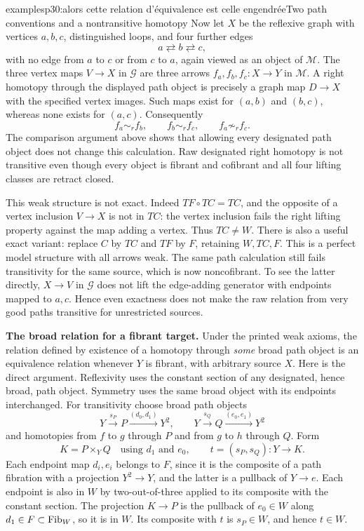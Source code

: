 \begin{dcomment}{examples}{p30:alors cette relation d'équivalence est celle engendrée}{Two path conventions and a nontransitive homotopy}
Now let $X$ be the reflexive graph with vertices $a,b,c$, distinguished loops, and four further edges
\[
 a\rightleftarrows b\rightleftarrows c,
\]
with no edge from $a$ to $c$ or from $c$ to $a$, again viewed as an object of $\mathcal M$. The three vertex maps $V\to X$ in $\mathcal G$ are three arrows $f_a,f_b,f_c:X\to Y$ in $\mathcal M$. A right homotopy through the displayed path object is precisely a graph map $D\to X$ with the specified vertex images. Such maps exist for $(a,b)$ and $(b,c)$, whereas none exists for $(a,c)$. Consequently
\[
 f_a\sim_r f_b,\qquad f_b\sim_r f_c,
 \qquad f_a\not\sim_r f_c.
\]
The comparison argument above shows that allowing every designated path object does not change this calculation. Raw designated right homotopy is not transitive even though every object is fibrant and cofibrant and all four lifting classes are retract closed.

This weak structure is not exact. Indeed $TF\circ TC=TC$, and the opposite of a vertex inclusion $V\to X$ is not in $TC$: the vertex inclusion fails the right lifting property against the map adding a vertex. Thus $TC\ne W$. There is also a useful exact variant: replace $C$ by $TC$ and $TF$ by $F$, retaining $W,TC,F$. This is a perfect model structure with all arrows weak. The same path calculation still fails transitivity for the same source, which is now noncofibrant. To see the latter directly, $X\to V$ in $\mathcal G$ does not lift the edge-adding generator with endpoints mapped to $a,c$. Hence even exactness does not make the raw relation from very good paths transitive for unrestricted sources.

\noindent\textbf{The broad relation for a fibrant target.}
Under the printed weak axioms, the relation defined by existence of a homotopy through \emph{some} broad path object is an equivalence relation whenever $Y$ is fibrant, with arbitrary source $X$. Here is the direct argument. Reflexivity uses the constant section of any designated, hence broad, path object. Symmetry uses the same broad object with its endpoints interchanged. For transitivity choose broad path objects
\[
 Y\xrightarrow{s_P}P\xrightarrow{(d_0,d_1)}Y^2,
 \qquad
 Y\xrightarrow{s_Q}Q\xrightarrow{(e_0,e_1)}Y^2
\]
and homotopies from $f$ to $g$ through $P$ and from $g$ to $h$ through $Q$. Form
\[
 K=P\mathbin{\times_{Y}}Q
 \quad\text{using }d_1\text{ and }e_0,
 \qquad
 t=(s_P,s_Q):Y\longrightarrow K.
\]
Each endpoint map $d_i,e_i$ belongs to $F$, since it is the composite of a path fibration with a projection $Y^2\to Y$, and the latter is a pullback of $Y\to e$. Each endpoint is also in $W$ by two-out-of-three applied to its composite with the constant section. The projection $K\to P$ is the pullback of $e_0\in W$ along $d_1\in F\subset\mathrm{Fib}_W$, so it is in $W$. Its composite with $t$ is $s_P\in W$, and hence $t\in W$.


\end{dcomment}
